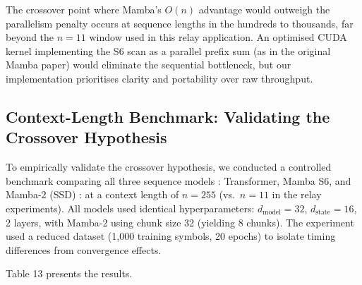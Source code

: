 The crossover point where Mamba's \(O(n)\) advantage would outweigh the parallelism penalty occurs at sequence lengths in the hundreds to thousands, far beyond the \(n = 11\) window used in this relay application. An optimised CUDA kernel implementing the S6 scan as a parallel prefix sum (as in the original Mamba paper) would eliminate the sequential bottleneck, but our implementation prioritises clarity and portability over raw throughput.

\subsection{Context-Length Benchmark: Validating the Crossover Hypothesis}\label{sec:context-length-benchmark-validating-the-crossover-hypothesis}

To empirically validate the crossover hypothesis, we conducted a controlled benchmark comparing all three sequence models : Transformer, Mamba S6, and Mamba-2 (SSD) : at a context length of \(n = 255\) (vs.~\(n = 11\) in the relay experiments). All models used identical hyperparameters: \(d_{\text{model}} = 32\), \(d_{\text{state}} = 16\), 2 layers, with Mamba-2 using chunk size 32 (yielding 8 chunks). The experiment used a reduced dataset (1,000 training symbols, 20 epochs) to isolate timing differences from convergence effects.

Table 13 presents the results.

